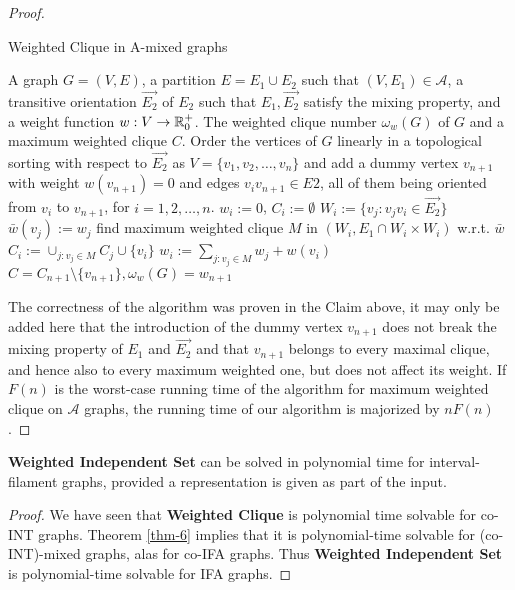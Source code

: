 \begin{proof}
	\begin{algorithm}[!ht]
		\caption{Weighted Clique in A-mixed graphs}
		\begin{algorithmic}[1]
			\Require A graph $G = (V, E)$, a partition $E = E_1 \cup E_2$ such that $(V, E_1) \in \mathcal{A}$, a transitive orientation $\overrightarrow{E_2}$ of $E_2$ such that $E_1 , \overrightarrow{E_2}$ satisfy the mixing property, and a weight function $w : V \to \mathbb{R}_0^+$.
			\Ensure The weighted clique number $\omega_w(G)$ of $G$ and a maximum weighted clique $C$.
			\State Order the vertices of $G$ linearly in a topological sorting with respect to $\overrightarrow{E_2}$ as $V = \{v_1 , v_2 , \dots, v_n\}$ and add a dummy vertex $v_{n+1}$ with weight $w(v_{n+1}) = 0$ and edges $v_i v_{n+1} \in E2$, all of them being oriented from $v_i$ to $v_{n+1}$, for $i = 1, 2, \dots, n$.
				\State $w_i := 0$, $C_i := \emptyset$
			\EndFor
				\State $W_i := \{v_j : v_j v_i \in \overrightarrow{E_2}\}$
					\State $\bar{w}(v_j) := w_j$
				\EndFor
				\State find maximum weighted clique $M$ in $(W_i, E_1 \cap W_i \times W_i)$ w.r.t. $\bar{w}$
				\State $C_i := \cup_{j:v_j \in M} C_j \cup \{v_i\}$
				\State $w_i := \sum_{j:v_j \in M} w_j + w(v_i)$
			\EndFor
			\State \Return $C = C_{n+1} \setminus \{v_{n+1}\}, \omega_w (G) = w_{n+1}$
		\end{algorithmic}
	\end{algorithm}
	
	The correctness of the algorithm was proven in the Claim above, it may only be added here that the introduction of the dummy vertex $v_{n+1}$ does not break the mixing property of $E_1$ and $\overrightarrow{E_2}$ and that $v_{n+1}$ belongs to every maximal clique, and hence also to every maximum weighted one, but does not affect its weight. If $F(n)$ is the worst-case running time of the algorithm for maximum weighted clique on $\mathcal{A}$ graphs, the running time of our algorithm is majorized by $nF(n)$.
\end{proof}

\begin{cor}
	\textbf{Weighted Independent Set} can be solved in polynomial time for interval-filament graphs, provided a representation is given as part of the input.
\end{cor}

\begin{proof}
	We have seen that \textbf{Weighted Clique} is polynomial time solvable for co-INT graphs. Theorem \ref{thm-6} implies that it is polynomial-time solvable for (co-INT)-mixed graphs, alas for co-IFA graphs. Thus \textbf{Weighted Independent Set} is polynomial-time solvable for IFA graphs.
\end{proof}